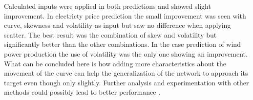  Calculated inputs were applied in both predictions and showed slight improvement. In electricty price prediction the small improvement was seen with curve, skewness and volatility as input but saw no difference when applying scatter. The best result was the combination of skew and volatility but significantly better than the other combinations. In the case prediction of wind power production the use of volatility was the only one showing an improvement. What can be concluded here is how adding more characteristics about the movement of the curve can help the generalization of the network to approach its target even though only slightly. Further analysis and experimentation with other methods could possibly lead to better performance .